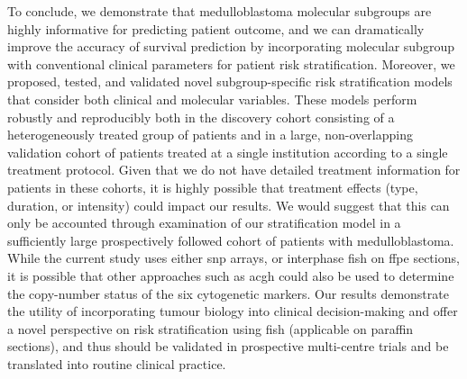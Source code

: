 To conclude, we demonstrate that medulloblastoma molecular subgroups are highly informative for predicting patient outcome, and we can dramatically improve the accuracy of survival prediction by incorporating molecular subgroup with conventional clinical parameters for patient risk stratification. Moreover, we proposed, tested, and validated novel subgroup-specific risk stratification models that consider both clinical and molecular variables. These models perform robustly and reproducibly both in the discovery cohort consisting of a heterogeneously treated group of patients and in a large, non-overlapping validation cohort of patients treated at a single institution according to a single treatment protocol. Given that we do not have detailed treatment information for patients in these cohorts, it is highly possible that treatment effects (type, duration, or intensity) could impact our results. We would suggest that this can only be accounted through examination of our stratification model in a sufficiently large prospectively followed cohort of patients with medulloblastoma. While the current study uses either \gls{snp} arrays, or interphase \gls{fish} on \gls{ffpe} sections, it is possible that other approaches such as \gls{acgh} could also be used to determine the copy-number status of the six cytogenetic markers. Our results demonstrate the utility of incorporating tumour biology into clinical decision-making and offer a novel perspective on risk stratification using \gls{fish} (applicable on paraffin sections), and thus should be validated in prospective multi-centre trials and be translated into routine clinical practice.








\clearpage
